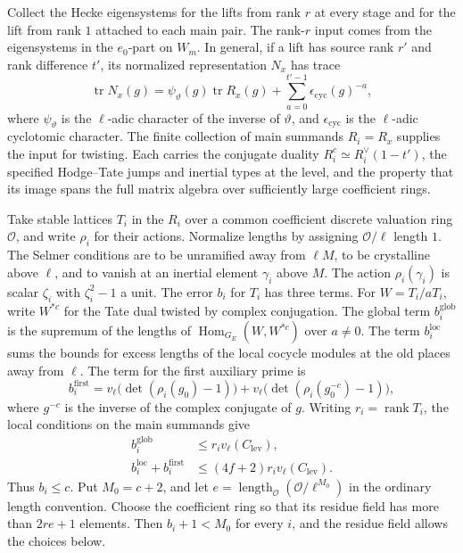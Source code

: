 Collect the Hecke eigensystems for the lifts from rank \(r\) at every
stage and for the lift from rank \(1\) attached to each main pair.
The rank-\(r\) input comes from the eigensystems in the \(e_0\)-part
on \(W_m\). In general, if a lift has source rank \(r'\) and rank
difference \(t'\), its normalized representation \(N_x\) has trace
\[
 \operatorname{tr}N_x(g)
 =\psi_\vartheta(g)\operatorname{tr}R_x(g)
   +\sum_{a=0}^{t'-1}\epsilon_{\mathrm{cyc}}(g)^{-a},
\]
where \(\psi_\vartheta\) is the \(\ell\)-adic character of the inverse
of \(\vartheta\), and
\(\epsilon_{\mathrm{cyc}}\) is the \(\ell\)-adic cyclotomic character.
The finite collection of main summands \(R_i=R_x\) supplies the
input for twisting. Each carries the conjugate duality
\(R_i^c\simeq R_i^\vee(1-t')\), the specified Hodge--Tate jumps and
inertial types at the level, and the property that its image spans the
full matrix algebra over sufficiently large coefficient rings.



Take stable lattices \(T_i\) in the \(R_i\) over a common coefficient
discrete valuation ring \(\mathcal O\), and write \(\rho_i\) for their
actions. Normalize lengths by assigning \(\mathcal O/\ell\) length \(1\).
The Selmer conditions are to be unramified away from \(\ell M\), to be
crystalline above \(\ell\), and to vanish at an inertial element
\(\gamma_i\) above \(M\). The action \(\rho_i(\gamma_i)\) is scalar
\(\zeta_i\) with \(\zeta_i^2-1\) a unit. The error \(b_i\) for \(T_i\)
has three terms. For \(W=T_i/aT_i\), write \(W^{*c}\) for the Tate
dual twisted by complex conjugation. The global term \(b_i^{\mathrm{glob}}\)
is the supremum of the lengths of \(\operatorname{Hom}_{G_E}(W,W^{*c})\)
over \(a\ne0\). The term \(b_i^{\mathrm{loc}}\) sums the bounds for
excess lengths of the local cocycle modules at the old places away
from \(\ell\). The term for the first auxiliary prime is
\[
 b_i^{\mathrm{first}}
   =v_\ell\big(\det(\rho_i(g_0)-1)\big)
    +v_\ell\big(\det(\rho_i(g_0^{-c})-1)\big),
\]
where \(g^{-c}\) is the inverse of the complex conjugate of \(g\).
Writing \(r_i=\operatorname{rank}T_i\), the local conditions on the main
summands give
\[
 \begin{split}
 b_i^{\mathrm{glob}}&\le r_i v_\ell(C_{\mathrm{lev}}),\\
 b_i^{\mathrm{loc}}+b_i^{\mathrm{first}}
                   &\le (4f+2)r_i v_\ell(C_{\mathrm{lev}}).
 \end{split}
\]
Thus \(b_i\le c\). Put \(M_0=c+2\), and let
\(e=\operatorname{length}_{\mathcal O}(\mathcal O/\ell^{M_0})\) in the
ordinary length convention. Choose the coefficient ring so that its
residue field has more than \(2re+1\) elements. Then \(b_i+1<M_0\) for
every \(i\), and the residue field allows the choices below.

